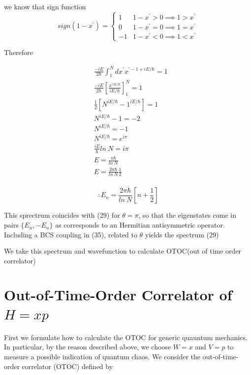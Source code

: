 \documentclass[12pt]{report}
\newcommand*{\1}{\hspace{1pt}}
\begin{document}
        we know that sign function
        \[ sign(1-x^{'}) = \begin{cases} 
            1 & 1-x^{'} > 0  \implies 1 > x^{'} \\
            0 & 1-x^{'} = 0 \implies 1=x^{'} \\
            -1 & 1-x^{'} < 0 \implies 1<x^{'} 
         \end{cases}
      \]

        Therefore

        \begin{align*}
            &\frac{-iE}{2\hbar}\int _{1}^{N} dx^{'} x^{' -1+iE/\hbar} = 1 \\
            &\frac{-iE}{2\hbar} \left[\frac{x^{'iE/\hbar}}{iE/\hbar}\right] _{1} ^{N} = 1 \\
            &\frac{1}{2} \left[N^{iE/\hbar} - 1^{iE/\hbar}\right] = 1 \\
            &N^{iE/\hbar} - 1 = -2 \\ 
            &N^{iE/\hbar} = -1 \\ 
            &N^{iE/\hbar} = e^{i\pi} \\ 
            &\frac{iE}{\hbar}ln\ N = i\pi \\ 
            &E = \frac{\pi\hbar}{ln\ N} \\ 
            &E = \frac{2\pi\hbar}{ln\ N}\frac{1}{2} \\  
        \end{align*}

        \begin{equation}
            \therefore E_{n} = \frac{2\pi\hbar}{ln\ N}\left[n + \frac{1}{2}\right] 
        \end{equation}

        This sprectrum coincides with (29) for $\theta=\pi$, so that the eigenstates come in pairs $\{E_{n}, -E_{n}\}$ as corresponds to an Hermitian antisymmetric
        operator. Including a BCS coupling in (35), related to $\theta$ yields the spectrum (29)\cite{s9}

        We take this spectrum and wavefunction to calculate OTOC(out of time order correlator)

    \newpage


    \chapter{Out-of-Time-Order Correlator of $H=xp$}
        
        First we formulate how to calculate the OTOC for generic quauntum mechanics. In particular, by the reason described above, we choose $W = x$ and $V = p$ to measure
        a possible indication of quantum chaos. We consider the out-of-time-order correlator (OTOC) defined by
\end{document}

